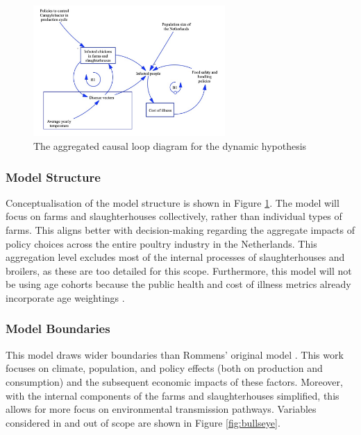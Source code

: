 \begin{figure}[h]
\centering
\includegraphics[width=0.65\textwidth]{images/dynamic_hypo2.png}
\caption{The aggregated causal loop diagram for the dynamic hypothesis}
\label{fig:aggregrated_cld}
\end{figure}
 
\subsubsection*{Model Structure}
Conceptualisation of the model structure is shown in Figure \ref{fig:aggregrated_cld}. The model will focus on farms and slaughterhouses collectively, rather than individual types of farms. This aligns better with decision-making regarding the aggregate impacts of policy choices across the entire poultry industry in the Netherlands. This aggregation level excludes most of the internal processes of slaughterhouses and broilers, as these are too detailed for this scope. Furthermore, this model will not be using age cohorts because the public health and cost of illness metrics already incorporate age weightings \parencite{mangen_campylobacteriosis_2007}.  %
\subsubsection*{Model Boundaries}

This model draws wider boundaries than Rommens' original model \parencite{rommens_infected_2020}. This work focuses on climate, population, and policy effects (both on production and consumption) and the subsequent economic impacts of these factors. Moreover, with the internal components of the farms and slaughterhouses simplified, this allows for more focus on environmental transmission pathways. Variables considered in and out of scope are shown in Figure \ref{fig:bullseye}.

